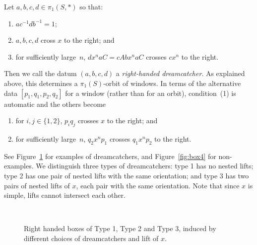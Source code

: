 \begin{definition}[Dreamcatcher]
\label{def:righthandeddreamcatcher}
Let $a,b,c,d \in \pi_1(S,\ast)$ so that:
\begin{enumerate}
\item $a c^{-1} d b^{-1} = 1$;
\item $a,b,c,d$ cross $x$ to the right; and
\item for sufficiently large~$n$,
  $dx^naC
  = cAbx^naC$ crosses
  $cx^n$ to the right.
\end{enumerate}
Then we call the datum $(a,b,c,d)$ a \emph{right-handed dreamcatcher}.
As explained above, this determines a $\pi_1(S)$-orbit of windows. In
terms of the alternative data $[p_1,q_1,p_2,q_2]$ for a window (rather
than for an orbit), condition~(1) is automatic and the others
become
\begin{enumerate}[label=(\arabic*$^\prime$),start=2]
\item for $i,j \in \{1,2\}$, $p_iq_j$ crosses $x$ to the right; and
\item for sufficiently large~$n$, $q_2x^np_1$ crosses $q_1x^np_2$ to
  the right.
\end{enumerate}
\end{definition}
See Figure~\ref{fig:rhbox} for examples of
dreamcatchers, and Figure~\ref{fig:box4} for non-examples.
 We
distinguish three types of dreamcatchers: type 1 has
no nested lifts; type 2 has one pair of nested lifts with the same
orientation; and type 3 has two pairs of nested lifts of $x$, each
pair with the same orientation.
Note that since $x$ is simple, lifts
cannot intersect each other.

  \begin{figure}
\qquad
{}\\
\qquad
\caption{Right handed boxes of Type 1, Type 2 and Type 3, induced by
  different choices of dreamcatchers and lift of $x$.}
\label{fig:rhbox}
\end{figure}

